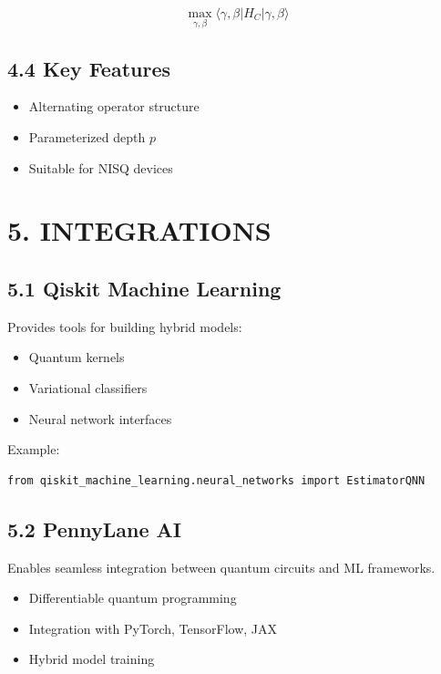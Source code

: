 \[
\max_{\gamma, \beta} \langle \gamma, \beta | H_C | \gamma, \beta \rangle
\]

\subsection*{4.4 Key Features}

\begin{itemize}
\item Alternating operator structure
\item Parameterized depth $p$
\item Suitable for NISQ devices
\end{itemize}

\vspace{0.5cm}

\section*{5. INTEGRATIONS}

\subsection*{5.1 Qiskit Machine Learning}

Provides tools for building hybrid models:

\begin{itemize}
\item Quantum kernels
\item Variational classifiers
\item Neural network interfaces
\end{itemize}

Example:

\begin{verbatim}
from qiskit_machine_learning.neural_networks import EstimatorQNN
\end{verbatim}

\subsection*{5.2 PennyLane AI}

Enables seamless integration between quantum circuits and ML frameworks.

\begin{itemize}
\item Differentiable quantum programming
\item Integration with PyTorch, TensorFlow, JAX
\item Hybrid model training
\end{itemize}

